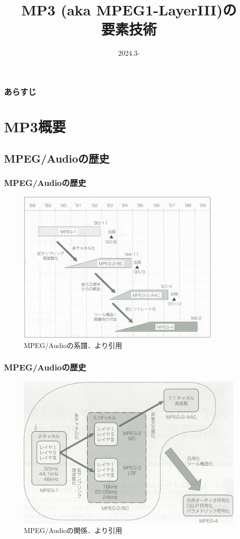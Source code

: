 \documentclass[14pt,xcolor=dvipsnames,table,dvipdfmx]{beamer}
\title{MP3 (aka MPEG1-LayerIII)の\\要素技術}
\author[]{}
\date{2024.3-}
\begin{document}
\maketitle

\begin{frame}[c]
    \frametitle{あらすじ}
    \tableofcontents
\end{frame}

\section{MP3概要}

\subsection{MPEG/Audioの歴史}

\begin{frame}[c]
    \frametitle{MPEG/Audioの歴史}
    \begin{figure}
        \includegraphics[width=100mm]{./figs/mpeg_history.jpg}
        \caption*{MPEG/Audioの系譜．\cite{fujiwara2001}より引用}
    \end{figure}
\end{frame}

\begin{frame}[c]
    \frametitle{MPEG/Audioの歴史}
    \begin{figure}
        \includegraphics[width=112mm]{./figs/mpeg_relation.jpg}
        \caption*{MPEG/Audioの関係．\cite{fujiwara2001}より引用}
    \end{figure}
\end{frame}
\end{document}
